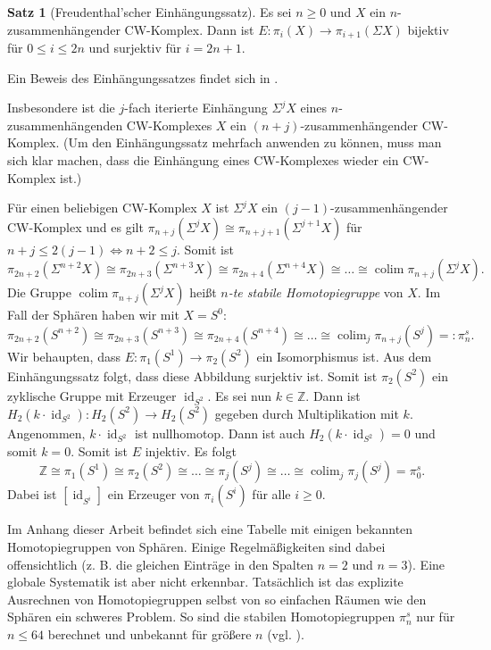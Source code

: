 \documentclass[11pt, a4paper, german]{article}
\theoremstyle{definition}
\newtheorem{satz}[lem]{Satz}
\theoremstyle{remark}
\newcommand{\Z}{\mathbb{Z}} %
\DeclareMathOperator{\id}{id} %
\DeclareMathOperator{\colim}{colim} %
\begin{document}
\begin{satz}[Freudenthal'scher Einhängungssatz]
  Es sei $n \geq 0$ und $X$ ein $n$-zusammenhängender CW-Komplex.
  Dann ist $E : \pi_i(X) \to \pi_{i+1}(\Sigma X)$ bijektiv für $0 \leq i \leq 2n$ und surjektiv für $i = 2n + 1$.
\end{satz}

Ein Beweis des Einhängungssatzes findet sich in \cite[\mbox{}4.24]{hatcher:at}.

Insbesondere ist die $j$-fach iterierte Einhängung $\Sigma^j X$ eines $n$-zusammenhängenden CW-Komplexes $X$ ein $(n{+}j)$-zusammenhängender CW-Komplex. (Um den Einhängungssatz mehrfach anwenden zu können, muss man sich klar machen, dass die Einhängung eines CW-Komplexes wieder ein CW-Komplex ist.)

Für einen beliebigen CW-Komplex $X$ ist $\Sigma^j X$ ein $(j{-}1)$-zusammenhängender CW-Komplex und es gilt $\pi_{n+j}(\Sigma^j X) \cong \pi_{n+j+1}(\Sigma^{j+1} X)$ für $n + j \leq 2(j-1) \Leftrightarrow n+2 \leq j$.
Somit ist
\[ \pi_{2n+2}(\Sigma^{n+2} X) \cong \pi_{2n+3}(\Sigma^{n+3} X) \cong \pi_{2n+4}(\Sigma^{n+4} X) \cong \ldots \cong \colim \pi_{n+j}(\Sigma^j X). \]
Die Gruppe $\colim \pi_{n+j}(\Sigma^j X)$ heißt \emph{$n$-te stabile Homotopiegruppe} von $X$.
Im Fall der Sphären haben wir mit $X = S^0$:
\[ \pi_{2n+2}(S^{n+2}) \cong \pi_{2n+3}(S^{n+3}) \cong \pi_{2n+4}(S^{n+4}) \cong \ldots \cong \colim_j \pi_{n+j}(S^j) =: \pi^s_n. \]
Wir behaupten, dass $E : \pi_1(S^1) \to \pi_2(S^2)$ ein Isomorphismus ist.
Aus dem Einhängungssatz folgt, dass diese Abbildung surjektiv ist.
Somit ist $\pi_2(S^2)$ ein zyklische Gruppe mit Erzeuger $\id_{S^2}$.
Es sei nun $k \in \Z$.
Dann ist $H_2(k \cdot \id_{S^2}) : H_2(S^2) \to H_2(S^2)$ gegeben durch Multiplikation mit $k$.
Angenommen, $k \cdot \id_{S^2}$ ist nullhomotop.
Dann ist auch $H_2(k \cdot \id_{S^2}) = 0$ und somit $k = 0$.
Somit ist $E$ injektiv.
Es folgt
\[ \Z \cong \pi_1(S^1) \cong \pi_2(S^2) \cong \ldots \cong \pi_j(S^j)  \cong \ldots \cong \colim_j \pi_j(S^j) = \pi^s_0. \]
Dabei ist $[\id_{S^i}]$ ein Erzeuger von $\pi_i(S^i)$ für alle $i \geq 0$.

Im Anhang dieser Arbeit befindet sich eine Tabelle mit einigen bekannten Homotopiegruppen von Sphären.
Einige Regelmäßigkeiten sind dabei offensichtlich (z. B. die gleichen Einträge in den Spalten $n{=}2$ und $n{=}3$).
Eine globale Systematik ist aber nicht erkennbar.
Tatsächlich ist das explizite Ausrechnen von Homotopiegruppen selbst von so einfachen Räumen wie den Sphären ein schweres Problem.
So sind die stabilen Homotopiegruppen $\pi_n^s$ nur für $n \leq 64$ berechnet und unbekannt für größere $n$ (vgl. \cite[384]{hatcher:at}).
\end{document}
